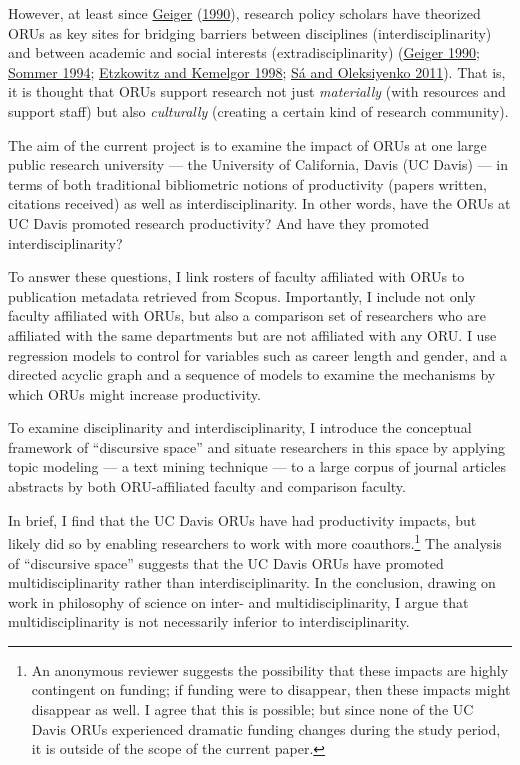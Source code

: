 \documentclass[
  11pt,
]{article}
\begin{document}
However, at least since \protect\hyperlink{ref-GeigerOrganizedResearchUnits1990}{Geiger} (\protect\hyperlink{ref-GeigerOrganizedResearchUnits1990}{1990}), research policy scholars have theorized ORUs as key sites for bridging barriers between disciplines (interdisciplinarity) and between academic and social interests (extradisciplinarity) (\protect\hyperlink{ref-GeigerOrganizedResearchUnits1990}{Geiger 1990}; \protect\hyperlink{ref-SommerServingTwoMasters1994}{Sommer 1994}; \protect\hyperlink{ref-EtzkowitzRoleResearchCentres1998}{Etzkowitz and Kemelgor 1998}; \protect\hyperlink{ref-SaLocalGlobalOrganized2011}{Sá and Oleksiyenko 2011}). That is, it is thought that ORUs support research not just \emph{materially} (with resources and support staff) but also \emph{culturally} (creating a certain kind of research community).

The aim of the current project is to examine the impact of ORUs at one large public research university --- the University of California, Davis (UC Davis) --- in terms of both traditional bibliometric notions of productivity (papers written, citations received) as well as interdisciplinarity. In other words, have the ORUs at UC Davis promoted research productivity? And have they promoted interdisciplinarity?

To answer these questions, I link rosters of faculty affiliated with ORUs to publication metadata retrieved from Scopus. Importantly, I include not only faculty affiliated with ORUs, but also a comparison set of researchers who are affiliated with the same departments but are not affiliated with any ORU. I use regression models to control for variables such as career length and gender, and a directed acyclic graph and a sequence of models to examine the mechanisms by which ORUs might increase productivity.

To examine disciplinarity and interdisciplinarity, I introduce the conceptual framework of ``discursive space'' and situate researchers in this space by applying topic modeling --- a text mining technique --- to a large corpus of journal articles abstracts by both ORU-affiliated faculty and comparison faculty.

In brief, I find that the UC Davis ORUs have had productivity impacts, but likely did so by enabling researchers to work with more coauthors.\footnote{An anonymous reviewer suggests the possibility that these impacts are highly contingent on funding; if funding were to disappear, then these impacts might disappear as well. I agree that this is possible; but since none of the UC Davis ORUs experienced dramatic funding changes during the study period, it is outside of the scope of the current paper.} The analysis of ``discursive space'' suggests that the UC Davis ORUs have promoted multidisciplinarity rather than interdisciplinarity. In the conclusion, drawing on work in philosophy of science on inter- and multidisciplinarity, I argue that multidisciplinarity is not necessarily inferior to interdisciplinarity.
\end{document}
